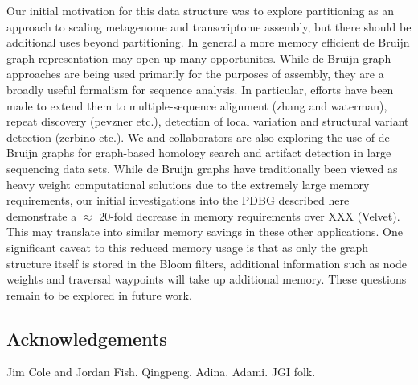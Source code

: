 \documentclass[12pt]{article} \usepackage{simplemargins}
\begin{document}
Our initial motivation for this data structure was to explore
partitioning as an approach to scaling metagenome and transcriptome
assembly, but there should be additional uses beyond partitioning. In
general a more memory efficient de Bruijn graph representation may
open up many opportunites.  While de Bruijn graph approaches are being
used primarily for the purposes of assembly, they are a broadly useful
formalism for sequence analysis. In particular, efforts have been made
to extend them to multiple-sequence alignment (zhang and waterman),
repeat discovery (pevzner etc.), detection of local variation and
structural variant detection (zerbino etc.).  We and collaborators are
also exploring the use of de Bruijn graphs for graph-based homology
search and artifact detection in large sequencing data sets.  While de
Bruijn graphs have traditionally been viewed as heavy weight
computational solutions due to the extremely large memory
requirements, our initial investigations into the PDBG described here
demonstrate a $\approx$ 20-fold decrease in memory requirements over
XXX (Velvet).  This may translate into similar memory savings in these
other applications.  One significant caveat to this reduced memory
usage is that as only the graph structure itself is stored in the
Bloom filters, additional information such as node weights and
traversal waypoints will take up additional memory.  These questions
remain to be explored in future work.

\subsection{Acknowledgements}

Jim Cole and Jordan Fish.  Qingpeng.  Adina.  Adami.  JGI folk.



\end{document}
